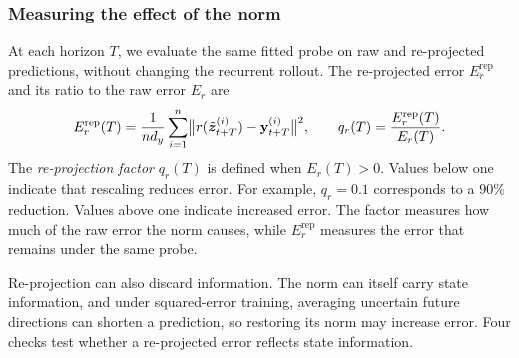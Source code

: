 \subsubsection{Measuring the effect of the norm}
\label{sec:reprojection}
At each horizon $T$, we evaluate the same fitted probe on raw and re-projected predictions, without changing the recurrent rollout. The re-projected error $E_r^{\mathrm{rep}}$ and its ratio to the raw error $E_r$ are
\begin{equation}
E_r^{\mathrm{rep}}(T)
=\frac{1}{n d_y}\sum_{i=1}^{n}
\bigl\|r(\tilde{\bm{z}}^{(i)}_{t+T})-\mathbf y^{(i)}_{t+T}\bigr\|^2,
\qquad
q_r(T)=\frac{E_r^{\mathrm{rep}}(T)}{E_r(T)} .
\label{eq:reprojection_factor}
\end{equation}
The \emph{re-projection factor} $q_r(T)$ is defined when $E_r(T)>0$. Values below one indicate that rescaling reduces error. For example, $q_r=0.1$ corresponds to a $90\%$ reduction. Values above one indicate increased error. The factor measures how much of the raw error the norm causes, while $E_r^{\mathrm{rep}}$ measures the error that remains under the same probe.

Re-projection can also discard information. The norm can itself carry state information, and under squared-error training, averaging uncertain future directions can shorten a prediction, so restoring its norm may increase error. Four checks test whether a re-projected error reflects state information.

